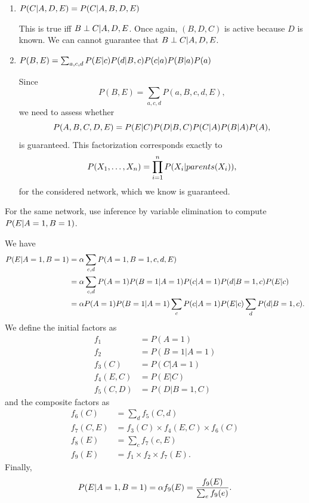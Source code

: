 \documentclass[11pt, a4paper]{article}
\begin{document}
\begin{enumerate}
    \item $P(C \vert A, D, E) = P(C \vert A, B, D, E)$

    \begin{solution}
        This is true iff $B \perp C \vert A, D, E$. Once again, $(B, D, C)$ is active because $D$ is known. We can cannot guarantee that $B \perp C \vert A, D, E$.
    \end{solution}

    \item $P(B, E) = \sum_{a, c, d} P(E \vert c) P(d \vert B, c) P(c \vert a) P(B \vert a) P(a)$

    \begin{solution}
        Since $$P(B, E) = \sum_{a, c, d} P(a, B, c, d, E),$$ we need to assess whether $$P(A, B, C, D, E) = P(E \vert C) P(D \vert B, C) P(C \vert A) P(B \vert A) P(A),$$
        is guaranteed. This factorization corresponds exactly to
        \begin{equation*}
            P(X_1, \dots, X_n) = \prod_{i = 1}^n P(X_i \vert parents(X_i)) ,
        \end{equation*}
        for the considered network, which we know is guaranteed.
    \end{solution}
\end{enumerate}

For the same network, use inference by variable elimination to compute $P(E \vert A = 1, B = 1)$.

\begin{solution}
    We have
    \begin{align*}
        P(E \vert A = 1, B = 1) & = \alpha \sum_{c, d} P(A = 1, B = 1, c, d, E)\\
        & = \alpha \sum_{c, d} P(A = 1) P(B = 1| A = 1) P(c| A = 1) P(d|B = 1, c) P(E|c) \\
        & = \alpha P(A = 1) P(B = 1 | A = 1) \sum_{c} P(c|A = 1) P(E|c)\sum_d P(d|B = 1,c) .
    \end{align*}
    We define the initial factors as
    \begin{align*}
        f_1 & = P(A=1) \\
        f_2 & = P(B=1 | A=1) \\
        f_3(C) & = P(C|A=1) \\
        f_4(E, C) & = P(E|C) \\
        f_5(C, D) & = P(D|B=1, C)
    \end{align*}
    and the composite factors as
    \begin{align*}
        f_6(C) & = \sum_d f_5(C, d) \\
        f_7(C, E) & = f_3(C) \times f_4(E, C) \times f_6(C) \\
        f_8(E) & = \sum_c f_7(c, E) \\
        f_9(E) & = f_1 \times f_2 \times f_7(E) .
    \end{align*}
    Finally,
    \begin{equation*}
        P(E \vert A = 1, B = 1) = \alpha f_9(E) = \frac{f_9(E)}{\sum_e f_9(e)}.
    \end{equation*}
\end{solution}
\end{document}
